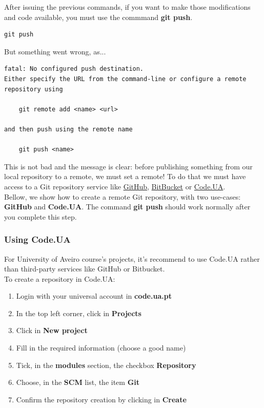 \documentclass{article}
\begin{document}
After issuing the previous commands, if you want to make those modifications and code available, you must use the commmand \textbf{git push}.

\begin{lstlisting}
git push
\end{lstlisting}

But something went wrong, as...

\begin{lstlisting}
fatal: No configured push destination.
Either specify the URL from the command-line or configure a remote repository using

    git remote add <name> <url>

and then push using the remote name

    git push <name>

\end{lstlisting}

This is not bad and the message is clear: before publishing something from our local repository to a remote, we must set a remote! To do that we must have access to a Git repository service like \href{https://github.com}{GitHub}, \href{https://bitbucket.org}{BitBucket} or \href{http://code.ua.pt}{Code.UA}. \\

Bellow, we show how to create a remote Git repository, with two use-cases: \textbf{GitHub} and \textbf{Code.UA}. The command \textbf{git push} should work normally after you complete this step.

\subsubsection{Using Code.UA}

For University of Aveiro course's projects, it's recommend to use Code.UA rather than third-party services like GitHub or Bitbucket.\\

To create a repository in Code.UA:

\begin{enumerate}
\item Login with your universal account in\underline{} \textbf{code.ua.pt}
\item In the top left corner, click in \textbf{Projects}
\item Click in \textbf{New project}
\item Fill in the required information (choose a good name)
\item Tick, in the \textbf{modules} section, the checkbox \textbf{Repository}
\item Choose, in the \textbf{SCM} list, the item \textbf{Git}
\item Confirm the repository creation by clicking in \textbf{Create}
\end{enumerate}
\end{document}
